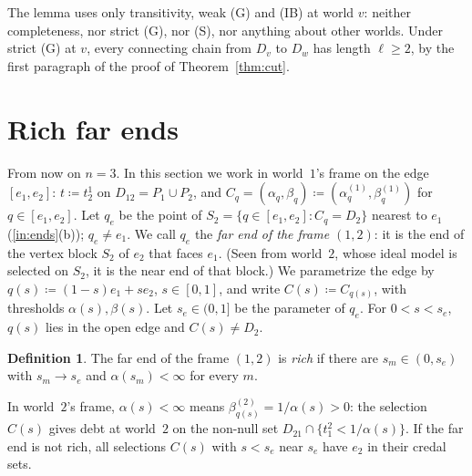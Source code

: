 \documentclass[11pt]{article}
\theoremstyle{definition}\newtheorem{definition}[theorem]{Definition}
\theoremstyle{remark}\newtheorem{remark}[theorem]{Remark}
\begin{document}
The lemma uses only transitivity, weak (G) and (IB) at world $v$: neither
completeness, nor strict (G), nor (S), nor anything about other worlds.
Under strict (G) at $v$, every connecting chain from $D_v$ to $D_w$ has
length $\ell\ge2$, by the first paragraph of the proof of
Theorem~\ref{thm:cut}.

\section{Rich far ends}\label{sec:rich}

From now on $n=3$. In this section we work in world~$1$'s frame on the edge
$[e_1,e_2]$: $t\coloneqq t^1_2$ on $D_{12}=P_1\cup P_2$, and
$C_q=(\alpha_q,\beta_q)\coloneqq(\alpha^{(1)}_q,\beta^{(1)}_q)$ for
$q\in[e_1,e_2]$. Let $q_e$ be the point of $S_2=\{q\in[e_1,e_2]:C_q=D_2\}$
nearest to $e_1$ (\ref{in:ends}(b)); $q_e\ne e_1$. We call $q_e$ the
\emph{far end of the frame $(1,2)$}: it is the end of the vertex block $S_2$
of $e_2$ that faces $e_1$. (Seen from world~$2$, whose ideal model is
selected on $S_2$, it is the near end of that block.) We parametrize the
edge by $q(s)\coloneqq(1-s)e_1+se_2$, $s\in[0,1]$, and write
$C(s)\coloneqq C_{q(s)}$, with thresholds $\alpha(s),\beta(s)$. Let
$s_e\in(0,1]$ be the parameter of $q_e$. For $0<s<s_e$, $q(s)$ lies in the
open edge and $C(s)\ne D_2$.

\begin{definition}\label{def:rich}
The far end of the frame $(1,2)$ is \emph{rich} if there are
$s_m\in(0,s_e)$ with $s_m\to s_e$ and $\alpha(s_m)<\infty$ for every $m$.
\end{definition}

In world~$2$'s frame, $\alpha(s)<\infty$ means
$\beta^{(2)}_{q(s)}=1/\alpha(s)>0$: the selection $C(s)$ gives debt at
world~$2$ on the non-null set $D_{21}\cap\{t^2_1<1/\alpha(s)\}$. If the far
end is not rich, all selections $C(s)$ with $s<s_e$ near $s_e$ have $e_2$ in
their credal sets.
\end{document}
